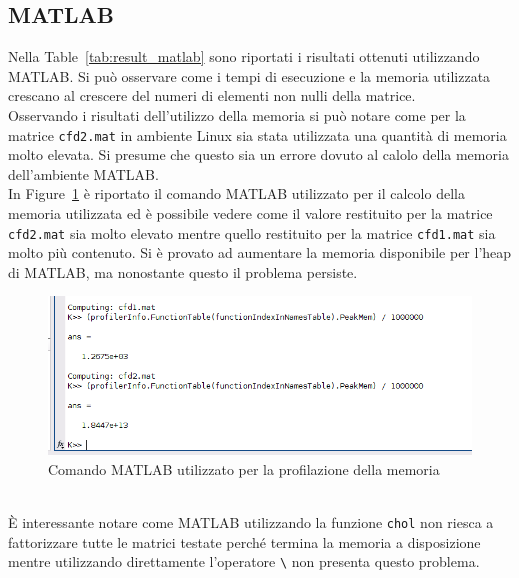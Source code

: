 \documentclass{report}
\begin{document}
            \subsection{MATLAB}
                Nella Table~\ref{tab:result_matlab} sono riportati i risultati ottenuti utilizzando MATLAB.
                Si può osservare come i tempi di esecuzione e la memoria utilizzata crescano al crescere del numeri di
                elementi non nulli della matrice.\\
                Osservando i risultati dell'utilizzo della memoria si può notare come per la matrice \texttt{cfd2.mat}
                in ambiente Linux sia stata utilizzata una quantità di memoria molto elevata. Si presume che questo
                sia un errore dovuto al calolo della memoria dell'ambiente MATLAB.\\
                In Figure~\ref{fig:matlab_overflow} è riportato il comando MATLAB utilizzato per il calcolo della 
                memoria utilizzata ed è possibile vedere come il valore restituito per la matrice \texttt{cfd2.mat} sia
                molto elevato mentre quello restituito per la matrice \texttt{cfd1.mat} sia molto più contenuto. 
                Si è provato ad aumentare la memoria disponibile per l'heap di MATLAB, ma nonostante questo il problema 
                persiste.
                \begin{figure}[h]
                    \includegraphics[width=\textwidth]{matlab_overflow}
                    \caption{Comando MATLAB utilizzato per la profilazione della memoria}
                    \label{fig:matlab_overflow}
                \end{figure}\\
                \`E interessante notare come MATLAB utilizzando la funzione \texttt{chol} non riesca a fattorizzare
                tutte le matrici testate perché termina la memoria a disposizione mentre utilizzando direttamente
                l'operatore \verb$\$ non presenta questo problema.\\
\end{document}
